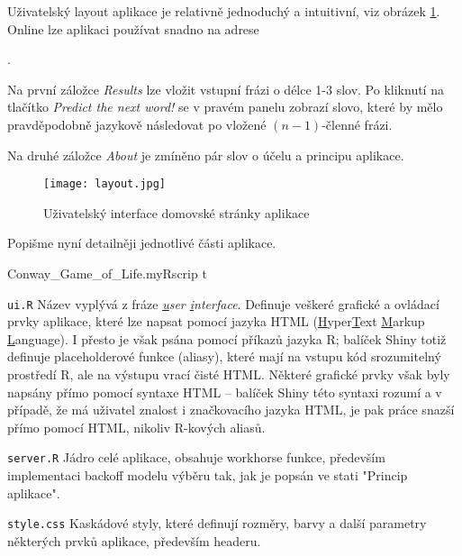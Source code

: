 Uživatelský layout aplikace je relativně jednoduchý a intuitivní, viz obrázek \ref{layout_fig}. Online lze aplikaci používat snadno na adrese

\begin{center}
  \href{http://shiny.statest.cz:3838/the\_next\_word\_prediction/}{}.
\end{center}

Na první záložce \textit{Results} lze vložit vstupní frázi o délce 1-3 slov. Po kliknutí na tlačítko \textit{Predict the next word!} se v pravém panelu zobrazí slovo, které by mělo pravděpodobně jazykově následovat po vložené $(n - 1)$-členné frázi.

Na druhé záložce \textit{About} je zmíněno pár slov o účelu a principu aplikace.

\begin{figure}[H]
  \centering
  \texttt{[image: layout.jpg]}
  \caption{Uživatelský interface domovské stránky aplikace}\label{layout_fig}
\end{figure}



Popišme nyní detailněji jednotlivé části aplikace.

\begin{labeling}{Conway\_Game\_of\_Life.myRscrip t}

  \item [\texttt{ui.R}] Název vyplývá z fráze \textit{\underline{u}ser \underline{i}nterface}. Definuje veškeré grafické a ovládací prvky aplikace, které lze napsat pomocí jazyka HTML (\underline{H}yper\underline{T}ext \underline{M}arkup \underline{L}anguage). I přesto je však psána pomocí příkazů jazyka \textsf{R}; balíček \textsf{Shiny} totiž definuje placeholderové funkce (aliasy), které mají na vstupu kód srozumitelný prostředí \textsf{R}, ale na výstupu vrací čisté HTML. Některé grafické prvky však byly napsány přímo pomocí syntaxe HTML -- balíček \textsf{Shiny} této syntaxi rozumí a v případě, že má uživatel znalost i značkovacího jazyka HTML, je pak práce snazší přímo pomocí HTML, nikoliv \textsf{R}-kových aliasů.
  
  \item [\texttt{server.R}] Jádro celé aplikace, obsahuje workhorse funkce, především implementaci backoff modelu výběru tak, jak je popsán ve stati "Princip aplikace".
 
  \item [\texttt{style.css}] Kaskádové styly, které definují rozměry, barvy a další parametry některých prvků aplikace, především headeru.

  
\end{labeling}




